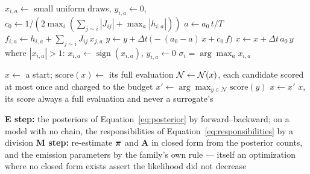 \documentclass[11pt,a4paper]{article}
\begin{document}
\begin{algorithm}[htbp]
\caption{Simulated bifurcation, Equation~\ref{eq:bifurcation-score}}
\label{alg:simulated-bifurcation}
\begin{algorithmic}[1]
\State $x_{i,a} \gets$ small uniform draws, $y_{i,a} \gets 0$, $c_0 \gets 1 / (2 \max_i (\sum_{j \sim i} |J_{ij}| + \max_a |h_{i,a}|))$
  \State $a \gets a_0\, t / T$
  \State $f_{i,a} \gets h_{i,a} + \sum_{j \sim i} J_{ij}\, x_{j,a}$ 
  \State $y \gets y + \Delta t\,\big(-(a_0 - a)\, x + c_0\, f\big)$
  \State $x \gets x + \Delta t\, a_0\, y$
  \State where $|x_{i,a}| > 1$: $x_{i,a} \gets \operatorname{sign}(x_{i,a})$, $y_{i,a} \gets 0$
\EndFor
\State \Return $\sigma_i = \arg\max_a x_{i,a}$ 
\end{algorithmic}
\end{algorithm}

\begin{algorithm}[htbp]
\caption{Hill climbing over a structural neighbourhood}
\label{alg:hill-climbing}
\begin{algorithmic}[1]
\State $x \gets$ a start; $\mathrm{score}(x) \gets$ its full evaluation
\Repeat
  \State $\mathcal{N} \gets \mathcal{N}(x)$, each candidate scored at most
         once and charged to the budget
  \State $x' \gets \arg\max_{y \in \mathcal{N}} \mathrm{score}(y)$
   $x \gets x'$ \EndIf
{}
\State \Return $x$, its score always a full evaluation and never a surrogate's
\end{algorithmic}
\end{algorithm}

\begin{algorithm}[htbp]
\caption{Expectation--maximization on a chain, or without one}
\label{alg:baum-welch}
\begin{algorithmic}[1]
\Repeat
  \State \textbf{E step:} the posteriors of Equation~\ref{eq:posterior} by
         forward--backward; on a model with no chain, the responsibilities of
         Equation~\ref{eq:responsibilities} by a division
  \State \textbf{M step:} re-estimate $\boldsymbol{\pi}$ and $\mathbf{A}$ in closed form
         from the posterior counts, and the emission parameters by the
         family's own rule --- itself an optimization where no closed form
         exists
  \State assert the likelihood did not decrease
\end{algorithmic}
\end{algorithm}
\end{document}
